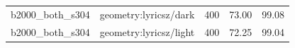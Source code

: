 \begin{longtable}{l>{\raggedright\arraybackslash}p{.42\linewidth}rrr}
b2000\_\allowbreak{}both\_\allowbreak{}s304 & %
geometry:lyricsz/dark & %
400 & %
73.00 & %
99.08 \\ %

b2000\_\allowbreak{}both\_\allowbreak{}s304 & %
geometry:lyricsz/light & %
400 & %
72.25 & %
99.04 \\ %


\end{longtable}
